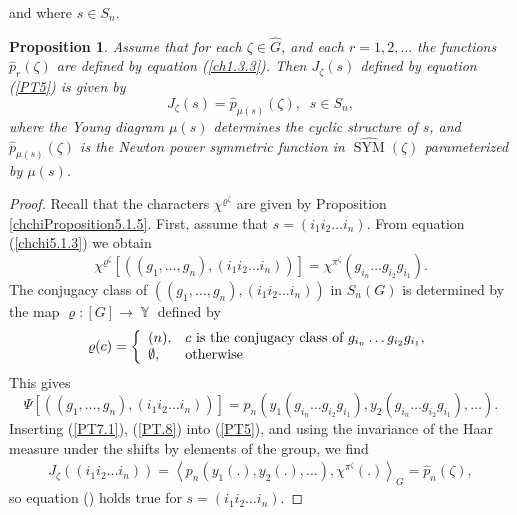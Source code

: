 \documentclass[12pt]{amsart}
\newtheorem{prop}[thm]{Proposition}
\theoremstyle{definition}
\numberwithin{equation}{section}
\DeclareMathOperator{\SYM}{SYM}
\DeclareMathOperator{\Y}{\mathbb{Y}}
\begin{document}
and where $s\in S_n$.
\begin{prop}\label{PropPT6}
Assume that for each $\zeta\in\widehat{G}$, and each $r=1,2,\ldots $ the functions $\widehat{p}_r(\zeta)$ are defined by equation (\ref{ch1.3.3}). Then $J_{\zeta}(s)$ defined by equation (\ref{PT5}) is given by
\begin{equation}\label{PT7}
J_{\zeta}(s)=\widehat{p}_{\mu(s)}(\zeta),\;\; s\in S_n,
\end{equation}
where the Young diagram $\mu(s)$ determines the cyclic structure of $s$, and
$\widehat{p}_{\mu(s)}(\zeta)$ is the Newton power symmetric function in $\widehat{\SYM}(\zeta)$
parameterized by $\mu(s)$.
\end{prop}
\begin{proof}
Recall that the characters $\chi^{\varrho^{\zeta}}$ are given by Proposition \ref{chchiProposition5.1.5}. First, assume that $s=(i_1i_2\ldots i_n)$. From equation
(\ref{chchi5.1.3}) we obtain
\begin{equation}\label{PT7.1}
\chi^{\varrho^{\zeta}}\left[\left((g_1,\ldots,g_n),(i_1i_2\ldots i_n)\right)\right]
=\chi^{\pi^{\zeta}}\left(g_{i_n}\ldots g_{i_2}g_{i_1}\right).
\end{equation}
The conjugacy class of $\left((g_1,\ldots,g_n),(i_1i_2\ldots i_n)\right)$ in $S_n(G)$
is determined by the map $\varrho: [G]\longrightarrow\Y$ defined by
$$
\varrho(c)=\left\{
  \begin{array}{ll}
    (n), & \hbox{$c$ is the conjugacy class of $g_{i_n}\ldots g_{i_2}g_{i_1}$}, \\
    \emptyset, & \hbox{otherwise}
  \end{array}
\right.
$$
This gives
\begin{equation}\label{PT.8}
\Psi\left[\left((g_1,\ldots,g_n),(i_1i_2\ldots i_n)\right)\right]=p_n\left(y_1(g_{i_n}\ldots g_{i_2}g_{i_1}),
y_2(g_{i_n}\ldots g_{i_2}g_{i_1}),\ldots\right).
\end{equation}
Inserting (\ref{PT7.1}), (\ref{PT.8}) into (\ref{PT5}), and
using the invariance of the Haar measure under the shifts by elements of the group, we find
\begin{equation}
\begin{split}
J_{\zeta}\left((i_1i_2\ldots i_n)\right)=\left<p_n\left(y_1(.),y_2(.),\ldots\right),
\chi^{\pi^{\zeta}}(.)\right>_{G}
=\widehat{p}_n(\zeta),
\end{split}
\end{equation}
so equation () holds true for $s=(i_1i_2\ldots i_n)$.


\end{proof}
\end{document}
